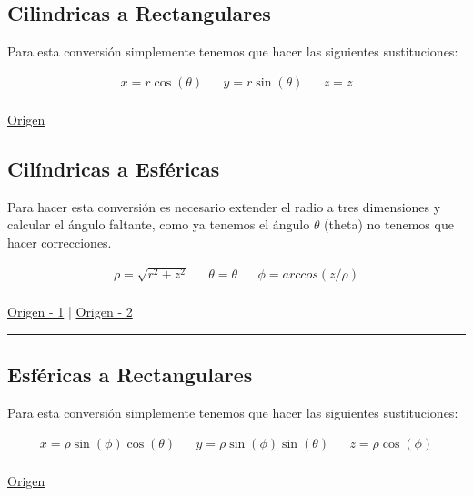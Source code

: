 \documentclass{article}
\begin{document}
\subsection{Cilindricas a Rectangulares}
\label{sec:org661e7ea}
Para esta conversión simplemente tenemos que hacer las siguientes sustituciones:

\[\begin{aligned}
 x = r \cos(\theta) && y = r \sin(\theta) && z = z \\
\end{aligned}\] 

\href{https://www.neurochispas.com/wiki/coordenadas-cilindricas-a-cartesianas/}{Origen}

\subsection{Cilíndricas a Esféricas}
\label{sec:org54f77fa}
Para hacer esta conversión es necesario extender el radio a tres dimensiones y calcular el ángulo faltante, como ya tenemos el ángulo \(\theta\) (theta) no tenemos que hacer correcciones.

\[\begin{aligned}
 \rho = \sqrt{r^2+z^2} && 
 \theta = \theta  &&
 \phi = arccos\left( z/\rho \right) \\
\end{aligned}\] 

\href{http://www.learningaboutelectronics.com/Articulos/Calculadora-de-conversion-de-coordenadas-cilindricas-a-esfericas.php}{Origen - 1} | \href{https://math.libretexts.org/Bookshelves/Calculus/Book:\_Calculus\_(OpenStax)/12:\_Vectors\_in\_Space/12.7:\_Cylindrical\_and\_Spherical\_Coordinates\#:\~:text=To\%20convert\%20a\%20point\%20from,r2+z2).}{Origen - 2}

\noindent\rule{\textwidth}{0.5pt}

\subsection{Esféricas a Rectangulares}
\label{sec:org8ceda27}
Para esta conversión simplemente tenemos que hacer las siguientes sustituciones:

\[\begin{aligned}
 x = \rho \sin(\phi)\cos(\theta) && 
 y = \rho \sin(\phi)\sin(\theta) &&
 z = \rho \cos(\phi) \\
\end{aligned}\] 

\href{https://www.neurochispas.com/wiki/coordenadas-esfericas-a-cartesianas/}{Origen}
\end{document}
